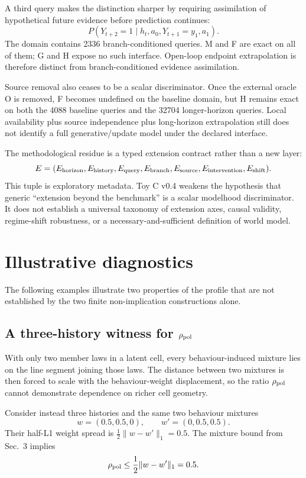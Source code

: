 \documentclass[10pt]{article}
\begin{document}
A third query makes the distinction sharper by requiring assimilation of hypothetical future evidence before prediction continues:
\[
P(Y_{t+2}=1\mid h_t,a_0,Y_{t+1}=y_1,a_1).
\]
The domain contains 2336 branch-conditioned queries. M and F are exact on all of them; G and H expose no such interface. Open-loop endpoint extrapolation is therefore distinct from branch-conditioned evidence assimilation.

Source removal also ceases to be a scalar discriminator. Once the external oracle O is removed, F becomes undefined on the baseline domain, but H remains exact on both the 4088 baseline queries and the 32704 longer-horizon queries. Local availability plus source independence plus long-horizon extrapolation still does not identify a full generative/update model under the declared interface.

The methodological residue is a typed extension contract rather than a new layer:
\[
E=(E_{\rm horizon},E_{\rm history},E_{\rm query},E_{\rm branch},E_{\rm source},E_{\rm intervention},E_{\rm shift}).
\]
This tuple is exploratory metadata. Toy C v0.4 weakens the hypothesis that generic ``extension beyond the benchmark'' is a scalar modelhood discriminator. It does not establish a universal taxonomy of extension axes, causal validity, regime-shift robustness, or a necessary-and-sufficient definition of world model.

\section{Illustrative diagnostics}

The following examples illustrate two properties of the profile that are not established by the two finite non-implication constructions alone.

\subsection{A three-history witness for $\rho_{\rm pol}$}
\label{sec:rho3}

With only two member laws in a latent cell, every behaviour-induced mixture lies on the line segment joining those laws. The distance between two mixtures is then forced to scale with the behaviour-weight displacement, so the ratio $\rho_{\rm pol}$ cannot demonstrate dependence on richer cell geometry.

Consider instead three histories and the same two behaviour mixtures
\[
w=(0.5,0.5,0),
\qquad
w'=(0,0.5,0.5).
\]
Their half-L1 weight spread is $\tfrac12\lVert w-w'\rVert_1=0.5$. The mixture bound from Sec.~3 implies
\[
\rho_{\rm pol}\le \frac12\lVert w-w'\rVert_1=0.5.
\]
\end{document}
